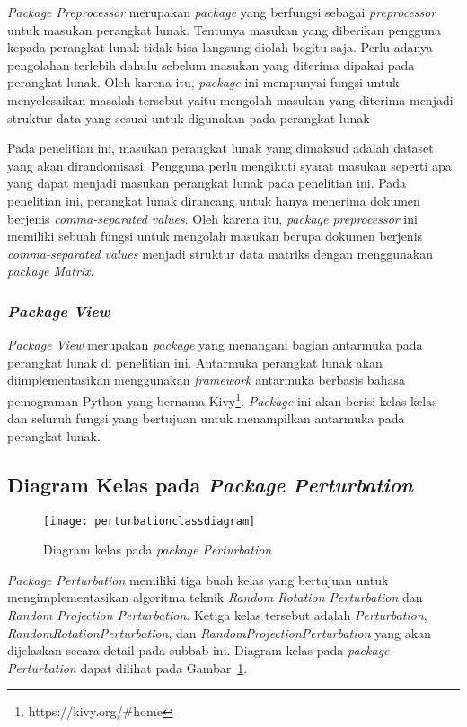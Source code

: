 \textit{Package Preprocessor} merupakan \textit{package} yang berfungsi sebagai \textit{preprocessor} untuk masukan perangkat lunak. Tentunya masukan yang diberikan pengguna kepada perangkat lunak tidak bisa langsung diolah begitu saja. Perlu adanya pengolahan terlebih dahulu sebelum masukan yang diterima dipakai pada perangkat lunak. Oleh karena itu, \textit{package} ini mempunyai fungsi untuk menyelesaikan masalah tersebut yaitu mengolah masukan yang diterima menjadi struktur data yang sesuai untuk digunakan pada perangkat lunak

Pada penelitian ini, masukan perangkat lunak yang dimaksud adalah dataset yang akan dirandomisasi. Pengguna perlu mengikuti syarat masukan seperti apa yang dapat menjadi masukan perangkat lunak pada penelitian ini. Pada penelitian ini, perangkat lunak dirancang untuk hanya menerima dokumen berjenis \textit{comma-separated values}. Oleh karena itu, \textit{package preprocessor} ini memiliki sebuah fungsi untuk mengolah masukan berupa dokumen berjenis \textit{comma-separated values} menjadi struktur data matriks dengan menggunakan \textit{package Matrix}.

\subsubsection{\textit{Package View}}
\label{subsubsec:package-view}

\textit{Package View} merupakan \textit{package} yang menangani bagian antarmuka pada perangkat lunak di penelitian ini. Antarmuka perangkat lunak akan diimplementasikan menggunakan \textit{framework} antarmuka berbasis bahasa pemograman Python yang bernama Kivy\footnote{https://kivy.org/\#home}. \textit{Package} ini akan berisi kelas-kelas dan seluruh fungsi yang bertujuan untuk menampilkan antarmuka pada perangkat lunak.

\subsection{Diagram Kelas pada \textit{Package Perturbation}}
\label{sec:diagram-kelas-perturbation}

\begin{figure}
	\centering
	\texttt{[image: perturbationclassdiagram]}
	\caption{Diagram kelas pada \textit{package Perturbation}}
	\label{fig:perturbationclassdiagram}
\end{figure}

\textit{Package Perturbation} memiliki tiga buah kelas yang bertujuan untuk mengimplementasikan algoritma teknik \textit{Random Rotation Perturbation} dan \textit{Random Projection Perturbation}. Ketiga kelas tersebut adalah \textit{Perturbation}, \textit{RandomRotationPerturbation}, dan \textit{RandomProjectionPerturbation} yang akan dijelaskan secara detail pada subbab ini. Diagram kelas pada \textit{package Perturbation} dapat dilihat pada Gambar~\ref{fig:perturbationclassdiagram}.

